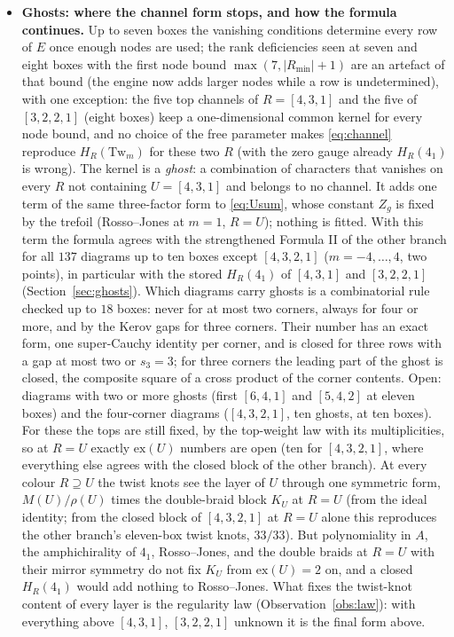 \documentclass[11pt]{article}
\newcommand{\Tw}{\mathrm{Tw}}
\begin{document}
\begin{itemize}
\item \textbf{Ghosts: where the channel form stops, and how the formula continues.}  Up to seven boxes the vanishing
conditions determine every row of $E$ once enough nodes are used; the rank deficiencies seen at seven and eight boxes with
the first node bound $\max(7,|R_{\min}|+1)$ are an artefact of that bound (the engine now adds larger nodes while a row
is undetermined), with one exception: the five top channels of $R=[4,3,1]$
and the five of $[3,2,2,1]$ (eight boxes) keep a one-dimensional common kernel for every node bound, and no choice of the
free parameter makes \eqref{eq:channel} reproduce $H_R(\Tw_m)$ for these two $R$ (with the zero gauge already
$H_R(4_1)$ is wrong).  The kernel is a \emph{ghost}: a combination of characters that vanishes on every $R$ not containing
$U=[4,3,1]$ and belongs to no channel.  It adds one term of the same three-factor form to \eqref{eq:Usum}, whose constant
$Z_g$ is fixed by the trefoil (Rosso--Jones at $m=1$, $R=U$); nothing is fitted.  With this term the formula agrees with
the strengthened Formula II of the other branch for all $137$ diagrams up to ten boxes except $[4,3,2,1]$ ($m=-4,\dots,4$,
two points), in particular with the stored $H_R(4_1)$ of $[4,3,1]$ and $[3,2,2,1]$ (Section~\ref{sec:ghosts}).  Which
diagrams carry ghosts is a combinatorial rule checked up to $18$ boxes: never for at most two corners, always for four or
more, and by the Kerov gaps for three corners.  Their number has an exact form, one super-Cauchy identity per corner, and
is closed for three rows with a gap at most two or $s_3=3$; for three corners the leading part of the ghost is closed, the
composite square of a cross product of the corner contents.  Open: diagrams with two or more ghosts (first $[6,4,1]$ and $[5,4,2]$ at
eleven boxes) and the four-corner diagrams ($[4,3,2,1]$, ten ghosts, at ten boxes).  For these the tops are still fixed,
by the top-weight law with its multiplicities, so at $R=U$ exactly $\mathrm{ex}(U)$ numbers are open (ten for
$[4,3,2,1]$, where everything else agrees with the closed block of the other branch).  At every colour $R\supseteq U$ the
twist knots see the layer of $U$ through one symmetric form, $M(U)/\rho(U)$ times the double-braid block $K_U$ at $R=U$
(from the ideal identity; from the closed block of $[4,3,2,1]$ at $R=U$ alone this reproduces the other branch's
eleven-box twist knots, $33/33$).  But polynomiality in $A$, the amphichirality of $4_1$, Rosso--Jones, and the double
braids at $R=U$ with their mirror symmetry do not fix $K_U$ from $\mathrm{ex}(U)=2$ on, and a closed $H_R(4_1)$ would add
nothing to Rosso--Jones.  What fixes the twist-knot content of every layer is the regularity law (Observation~\ref{obs:law}): with
everything above $[4,3,1]$, $[3,2,2,1]$ unknown it is the final form above.


\end{itemize}
\end{document}
